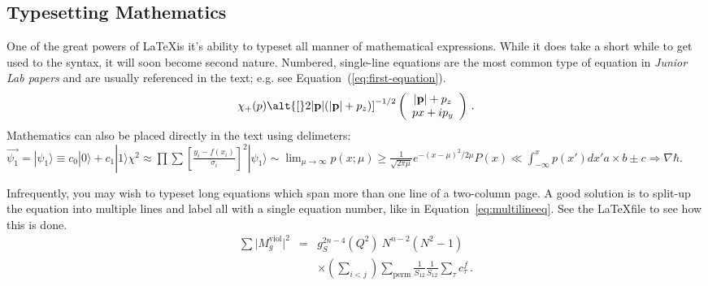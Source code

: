 \documentclass[aps,twocolumn,secnumarabic,nobalancelastpage,amsmath,amssymb,nofootinbib]{revtex4}
\begin{document}
\subsection{Typesetting Mathematics}

One of the great powers of \LaTeX is it's ability to typeset all
manner of mathematical expressions.  While it does take a short
while to get used to the syntax, it will soon become second nature.
Numbered, single-line equations are the most common type of equation
in \textit{Junior Lab papers} and are usually referenced in the
text; e.g. see Equation~(\ref{eq:first-equation}).
%
\begin{equation}
   \chi_+(p)\alt{\bf [}2|{\bf p}|(|{\bf p}|+p_z){\bf ]}^{-1/2}
   \left(
   \begin{array}{c}
      |{\bf p}|+p_z\\
      px+ip_y
   \end{array}\right)
\,. \label{eq:first-equation}
\end{equation}
%
%
Mathematics can also be placed directly in the text using
delimeters: $\vec{\psi_1} = |\psi_1\rangle \equiv c_0|0\rangle +
c_1|1\rangle \chi^2 \approx
\prod\sum\left[\frac{y_i-f(x_i)}{\sigma_i}\right]^2 |\psi_1\rangle
\sim \lim_{\mu \rightarrow \infty}p(x;\mu) \geq \frac{1}{\sqrt{2 \pi
\mu}} e^{-(x-\mu)^2 / 2\mu}P(x) \ll \int_{-\infty}^x p(x')dx'a
\times b \pm c \Rightarrow \nabla \hbar$.

Infrequently, you may wish to typeset long equations which span more
than one line of a two-column page.  A good solution is to split-up
the equation into multiple lines and label all with a single
equation number, like in Equation~\ref{eq:multilineeq}.  See the
\LaTeX file to see how this is done.
%
\begin{eqnarray}
  \sum \vert M^{\text{viol}}_g \vert ^2
   &=&  g^{2n-4}_S(Q^2)~N^{n-2} (N^2-1)
\nonumber
\\
   &&   \times \left( \sum_{i<j}\right) \sum_{\text{perm}}
            \frac{1}{S_{12}}  \frac{1}{S_{12}} \sum_\tau c^f_\tau
\,.
\label{eq:multilineeq}
\end{eqnarray}
\end{document}
